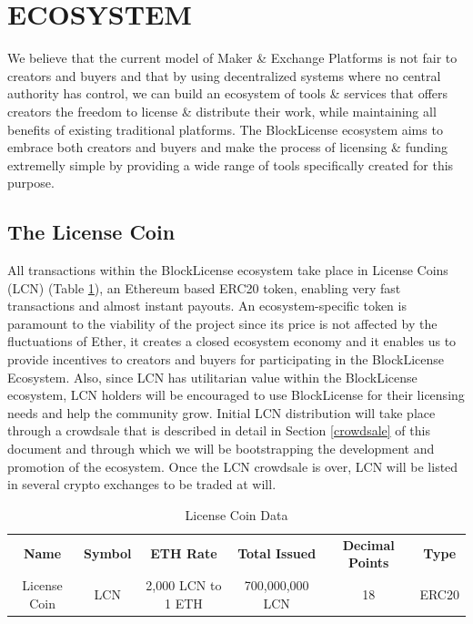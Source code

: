 \section{ECOSYSTEM} \label{ecosystem}

We believe that the current model of Maker \& Exchange Platforms is not fair to creators and buyers and that by using decentralized systems where no central authority has control, we can build an ecosystem of tools \& services that offers creators the freedom to license \& distribute their work, while maintaining all benefits of existing traditional platforms. The BlockLicense ecosystem aims to embrace both creators and buyers and make the process of licensing \& funding extremelly simple by providing a wide range of tools specifically created for this purpose.


\subsection{The License Coin}

All transactions within the BlockLicense ecosystem take place in License Coins (LCN) (Table \ref{table:lcn}), an Ethereum based ERC20 \cite{erc20} token, enabling very fast transactions and almost instant payouts. An ecosystem-specific token is paramount to the viability of the project since its price is not affected by the fluctuations of Ether, it creates a closed ecosystem economy and it enables us to provide incentives to creators and buyers for participating in the BlockLicense Ecosystem. Also, since LCN has utilitarian value within the BlockLicense ecosystem, LCN holders will be encouraged to use BlockLicense for their licensing needs and help the community grow. Initial LCN distribution will take place through a crowdsale that is described in detail in Section \ref{crowdsale} of this document and through which we will be bootstrapping the development and promotion of the ecosystem. Once the LCN crowdsale is over, LCN will be listed in several crypto exchanges to be traded at will.

\begin{table}[!htbp]
\begin{center}
\begin{tabular}{c c c c c c}
& & \\ %
\toprule
\textbf{Name} & \textbf{Symbol}  & \textbf{ETH Rate} & \textbf{Total Issued}  & \textbf{Decimal Points} & \textbf{Type}\\
\midrule
 License Coin & LCN & 2,000 LCN to 1 ETH & 700,000,000 LCN & 18 & ERC20\\
\bottomrule
\end{tabular}
\end{center}
\caption{License Coin Data}
\label{table:lcn}
\end{table}

